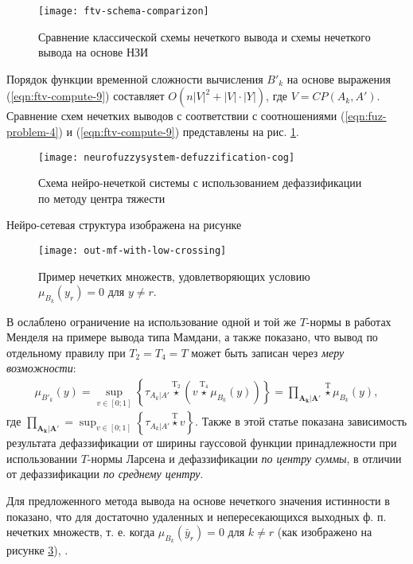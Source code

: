 \begin{figure}[tbh!]
\centering
\texttt{[image: ftv-schema-comparizon]}
\caption{Сравнение классической схемы нечеткого вывода и схемы нечеткого вывода на основе НЗИ}
\label{fig:ftv-schema-comparizon}
\end{figure}

Порядок функции временной сложности вычисления $B'_k$ на основе выражения (\ref{eqn:ftv-compute-9}) составляет $O\left(n|V|^2+|V|\cdot |Y|\right)$, где $V=CP(A_k, A')$. Сравнение схем нечетких выводов с соответствии с соотношениями (\ref{eqn:fuz-problem-4}) и (\ref{eqn:ftv-compute-9}) представлены на рис. \cref{fig:ftv-schema-comparizon}.

\begin{figure}[th]
	\centering
	\texttt{[image: neurofuzzysystem-defuzzification-cog]}
	\caption{Схема нейро-нечеткой системы с использованием дефаззификации по методу центра тяжести}
	\label{fig:neurofuzzysystem-defuzzification-cog}
\end{figure}

Нейро-сетевая структура изображена на рисунке 

\begin{figure}[ht]
	\centering
	\texttt{[image: out-mf-with-low-crossing]}
	\caption{Пример нечетких множеств, удовлетворяющих условию $\mu_{B_k}(y_r) = 0$ для $y \ne r$.}
	\label{fig:out-mf-with-low-crossing}
\end{figure}

В \cite{Sinuk2023} ослаблено ограничение на использование одной и той же $T$-нормы в работах Менделя на примере вывода типа Мамдани, а также показано, что вывод по отдельному правилу при $T_2 = T_4 = T$ может быть записан через \textit{меру возможности}:
\begin{align*}
	\mu_{B'_k}(y) = \sup_{v\in[0;1]}\left\{\tau_{A_{k}|A'} \overset{\mathrm{T_2}}{\star} (v \overset{\mathrm{T_4}}{\star} \mu_{B_k}(y)) \right\} = \textstyle\prod_{\mathbf{A_k}|\mathbf{A'}} \overset{\mathrm{T}}{\star} \mu_{B_k}(y),
\end{align*}
где $\prod_{\mathbf{A_k}|\mathbf{A'}}=\sup_{v\in[0;1]}\left\{\tau_{A_{k}|A'} \overset{\mathrm{T}}{\star} v\right\}$.
Также в этой статье показана зависимость результата дефаззификации от ширины гауссовой функции принадлежности при использовании $T$-нормы Ларсена и дефаззификации \textit{по центру суммы}, в отличии от дефаззификации \textit{по среднему центру}.

Для предложенного метода вывода на основе нечеткого значения истинности в \cite{Karatach2024} показано, что для достаточно удаленных и непересекающихся выходных ф. п. нечетких множеств, т. е. когда $\mu_{B_k}(\bar{y}_r) = 0$ для $k \ne r$ (как изображено на рисунке \cref{fig:out-mf-with-low-crossing}), .

